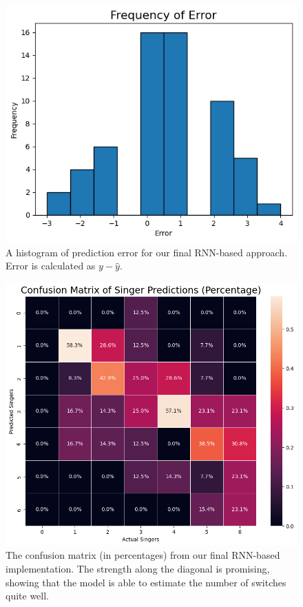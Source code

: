 \documentclass[conference]{IEEEtran}
\begin{document}
\begin{figure}[ht]
    \centering
    \includegraphics[scale=0.4]{RNN2_Error.png}
    \caption{A histogram of prediction error for our final RNN-based approach. Error is calculated as $y - \hat{y}$.}
    \label{fig:rnn2_error}
\end{figure}

\begin{figure}[ht]
    \centering
    \includegraphics[scale=0.25]{RNN2_confusion_matrix_pct.png}
    \caption{The confusion matrix (in percentages) from our final RNN-based implementation. The strength along the diagonal is promising, showing that the model is able to estimate the number of switches quite well.}
    \label{fig:rnn2_conf_mat_pct}
\end{figure}
\end{document}
